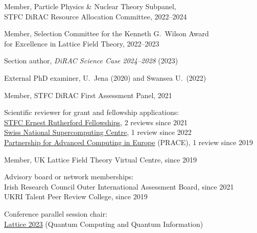 \documentclass[10 pt]{article}
\newenvironment{tightlist}
  {\begin{list} {} {\setlength{\topsep}{-8 pt} \setlength{\itemsep}{-3 pt} \setlength{\leftmargin}{0 mm}}}{\end{list}}
\begin{document}
\vspace{-12 pt} %
\begin{tightlist}
  \item Member, Particle Physics \& Nuclear Theory Subpanel, \\ \hfill STFC DiRAC Resource Allocation Committee, 2022--2024
  \item Member, Selection Committee for the Kenneth G.~Wilson Award \\ \hfill for Excellence in Lattice Field Theory, 2022--2023
  \item Section author, \textit{DiRAC Science Case 2024--2028} (2023)
  \item External PhD examiner, U.~Jena (2020) and Swansea U.~(2022)
  \item Member, STFC DiRAC First Assessment Panel, 2021
  \item Scientific reviewer for grant and fellowship applications:                                                                                                                          \\
    \qquad \href{https://www.ukri.org/what-we-offer/developing-people-and-skills/stfc/fellowships/ernest-rutherford-fellowships/}{STFC Ernest Rutherford Fellowships}, 2 reviews since 2021 \\
    \qquad \href{https://www.cscs.ch}{Swiss National Supercomputing Centre}, 1 review since 2022                                                                                            \\
    \qquad \href{https://prace-ri.eu}{Partnership for Advanced Computing in Europe} (PRACE), 1 review since 2019                                                                            \\
  \item Member, UK Lattice Field Theory Virtual Centre, since 2019
  \item Advisory board or network memberships:                                  \\
    \qquad Irish Research Council Outer International Assessment Board, since 2021 \\ %
    \qquad UKRI Talent Peer Review College, since 2019 %
  \item Conference parallel session chair:                                                                              \\
    \qquad \href{https://indico.fnal.gov/event/57249/}{Lattice 2023} (Quantum Computing and Quantum Information)        \\

\end{tightlist}
\end{document}
